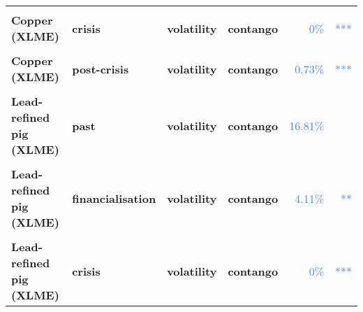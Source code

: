 \documentclass[
  authoryear,
  preprint,
  3p]{elsarticle}
\begin{document}
\begin{longtable}[t]{>{}l>{}l>{}l>{}l>{}r>{}r}
\textbf{\cellcolor{gray!10}{Copper (XLME)}} & \textbf{\cellcolor{gray!10}{crisis}} & \textbf{\cellcolor{gray!10}{mean}} & \textbf{\cellcolor{gray!10}{backwardation}} & \textcolor[HTML]{4285f4}{\cellcolor{gray!10}{43.61\%}} & \textcolor[HTML]{4285f4}{\cellcolor{gray!10}{}}\\
\addlinespace
\textbf{Copper (XLME)} & \textbf{crisis} & \textbf{volatility} & \textbf{contango} & \textcolor[HTML]{4285f4}{0\%} & \textcolor[HTML]{4285f4}{***}\\
\textbf{\cellcolor{gray!10}{Copper (XLME)}} & \textbf{\cellcolor{gray!10}{post-crisis}} & \textbf{\cellcolor{gray!10}{mean}} & \textbf{\cellcolor{gray!10}{backwardation}} & \textcolor[HTML]{4285f4}{\cellcolor{gray!10}{16.36\%}} & \textcolor[HTML]{4285f4}{\cellcolor{gray!10}{}}\\
\textbf{Copper (XLME)} & \textbf{post-crisis} & \textbf{volatility} & \textbf{contango} & \textcolor[HTML]{4285f4}{0.73\%} & \textcolor[HTML]{4285f4}{***}\\
\textbf{\cellcolor{gray!10}{Lead-refined pig (XLME)}} & \textbf{\cellcolor{gray!10}{past}} & \textbf{\cellcolor{gray!10}{mean}} & \textbf{\cellcolor{gray!10}{backwardation}} & \textcolor[HTML]{4285f4}{\cellcolor{gray!10}{58.96\%}} & \textcolor[HTML]{4285f4}{\cellcolor{gray!10}{}}\\
\textbf{Lead-refined pig (XLME)} & \textbf{past} & \textbf{volatility} & \textbf{contango} & \textcolor[HTML]{4285f4}{16.81\%} & \textcolor[HTML]{4285f4}{}\\
\addlinespace
\textbf{\cellcolor{gray!10}{Lead-refined pig (XLME)}} & \textbf{\cellcolor{gray!10}{financialisation}} & \textbf{\cellcolor{gray!10}{mean}} & \textbf{\cellcolor{gray!10}{contango}} & \textcolor[HTML]{4285f4}{\cellcolor{gray!10}{40.11\%}} & \textcolor[HTML]{4285f4}{\cellcolor{gray!10}{}}\\
\textbf{Lead-refined pig (XLME)} & \textbf{financialisation} & \textbf{volatility} & \textbf{contango} & \textcolor[HTML]{4285f4}{4.11\%} & \textcolor[HTML]{4285f4}{**}\\
\textbf{\cellcolor{gray!10}{Lead-refined pig (XLME)}} & \textbf{\cellcolor{gray!10}{crisis}} & \textbf{\cellcolor{gray!10}{mean}} & \textbf{\cellcolor{gray!10}{contango}} & \textcolor[HTML]{4285f4}{\cellcolor{gray!10}{93.17\%}} & \textcolor[HTML]{4285f4}{\cellcolor{gray!10}{}}\\
\textbf{Lead-refined pig (XLME)} & \textbf{crisis} & \textbf{volatility} & \textbf{contango} & \textcolor[HTML]{4285f4}{0\%} & \textcolor[HTML]{4285f4}{***}\\

\end{longtable}
\end{document}
